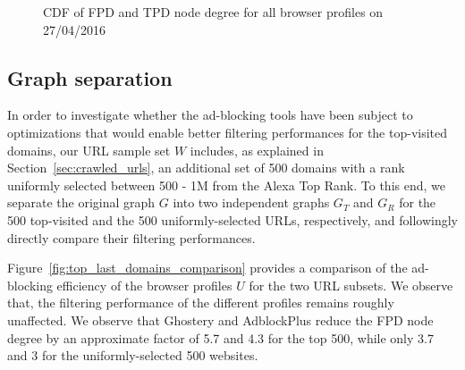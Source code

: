   \begin{figure}[!t]
  \centering
   \hfill
  
    \caption{CDF of FPD and TPD node degree for all browser profiles on 27/04/2016}
    \label{fig:cdf_first_third_node_degree}
\end{figure}

\subsection{Graph separation}
\label{sec:graph_separation}
In order to investigate whether the ad-blocking tools have been subject to optimizations that would enable better filtering performances for the top-visited domains, our URL sample set $W$ includes, as explained in Section~\ref{sec:crawled_urls}, an additional set of 500 domains with a rank uniformly selected between 500 - 1M from the Alexa Top Rank. To this end, we separate the original graph $G$ into two independent graphs $G_T$ and $G_R$ for the 500 top-visited and the 500 uniformly-selected URLs, respectively, and followingly directly compare their filtering performances.

Figure~\ref{fig:top_last_domains_comparison} provides a comparison of the ad-blocking efficiency of the browser profiles $U$ for the two URL subsets. We observe that, the filtering performance of the different profiles remains roughly unaffected. We observe that Ghostery and AdblockPlus reduce the FPD node degree by an approximate factor of 5.7 and 4.3 for the top 500, while only 3.7 and 3 for the uniformly-selected 500 websites.

